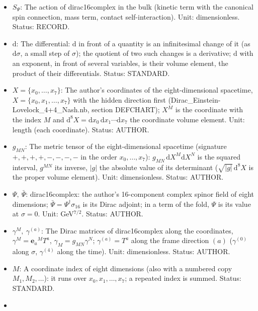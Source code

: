 \documentclass[
  10pt,
]{article}
\providecommand{\tightlist}{%
  \setlength{\itemsep}{0pt}\setlength{\parskip}{0pt}}
\begin{document}
\begin{itemize}
\tightlist
\item
  \(S_\Psi\): The action of dirac16complex in the bulk (kinetic term
  with the canonical spin connection, mass term, contact
  self-interaction). Unit: dimensionless. Status: RECORD.
\item
  \(\mathrm{d}\): The differential: \(\mathrm{d}\) in front of a
  quantity is an infinitesimal change of it (as \(\mathrm{d}\sigma\), a
  small step of \(\sigma\)); the quotient of two such changes is a
  derivative; \(\mathrm{d}\) with an exponent, in front of several
  variables, is their volume element, the product of their
  differentials. Status: STANDARD.
\item
  \(X = \{x_0, \dots, x_7\}\): The author's coordinates of the
  eight-dimensional spacetime, \(X = \{x_0, x_1, \dots, x_7\}\) with the
  hidden direction first (Dirac\_Einstein-Lovelock\_4+4\_Nash.nb,
  section DEFCHART); \(X^M\) is the coordinate with the index \(M\) and
  \(\mathrm{d}^8X = \mathrm{d}x_0\,\mathrm{d}x_1\cdots\mathrm{d}x_7\)
  the coordinate volume element. Unit: length (each coordinate). Status:
  AUTHOR.
\item
  \(g_{MN}\): The metric tensor of the eight-dimensional spacetime
  (signature \(+,+,+,+,-,-,-,-\) in the order \(x_0, \dots, x_7\)):
  \(g_{MN}\,\mathrm{d}X^M\mathrm{d}X^N\) is the squared interval,
  \(g^{MN}\) its inverse, \(\lvert g\rvert\) the absolute value of its
  determinant (\(\sqrt{\lvert g\rvert}\,\mathrm{d}^8X\) is the proper
  volume element). Unit: dimensionless. Status: AUTHOR.
\item
  \(\Psi,\ \bar\Psi\): dirac16complex: the author's 16-component complex
  spinor field of eight dimensions;
  \(\bar\Psi = \Psi^\dagger\sigma_{16}\) is its Dirac adjoint; in a term
  of the fold, \(\Psi\) is its value at \(\sigma = 0\). Unit:
  GeV\(^{7/2}\). Status: AUTHOR.
\item
  \(\gamma^M,\ \gamma^{(a)}\): The Dirac matrices of dirac16complex
  along the coordinates, \(\gamma^M = \mathbf{e}_a{}^MT^a\),
  \(\gamma_M = g_{MN}\gamma^N\); \(\gamma^{(a)} = T^a\) along the frame
  direction \((a)\) (\(\gamma^{(0)}\) along \(\sigma\), \(\gamma^{(4)}\)
  along the time). Unit: dimensionless. Status: AUTHOR.
\item
  \(M\): A coordinate index of eight dimensions (also with a numbered
  copy \(M_1, M_2, \dots\)): it runs over \(x_0, x_1, \dots, x_7\); a
  repeated index is summed. Status: STANDARD.
\item

\end{itemize}
\end{document}
